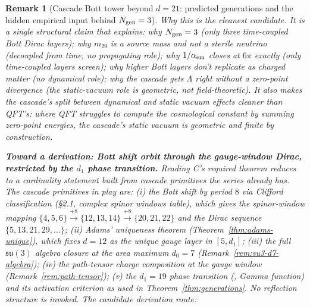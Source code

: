 \documentclass[12pt,a4paper]{article}
\newtheorem{remark}[theorem]{Remark}
\begin{document}
\begin{remark}[Cascade Bott tower beyond $d=21$: predicted generations and the hidden empirical input behind $N_{\rm gen}=3$]
\medskip\noindent\emph{Why this is the cleanest candidate.} It is a \emph{single} structural claim that explains: why $N_{\rm gen}=3$ (only three time-coupled Bott Dirac layers); why $m_{29}$ is a source mass and not a sterile neutrino (decoupled from time, no propagating role); why $1/\alpha_{\rm em}$ closes at $6\pi$ exactly (only time-coupled layers screen); why higher Bott layers don't replicate as charged matter (no dynamical role); why the cascade gets $\Lambda$ right without a zero-point divergence (the static-vacuum role is geometric, not field-theoretic). It also makes the cascade's split between dynamical and static vacuum effects \emph{cleaner than QFT's}: where QFT struggles to compute the cosmological constant by summing zero-point energies, the cascade's static vacuum is geometric and finite by construction.

\medskip\noindent\textbf{Toward a derivation: Bott shift orbit through the gauge-window Dirac, restricted by the $d_1$ phase transition.}
Reading C's required theorem reduces to a cardinality statement built from cascade primitives the series already has. The cascade primitives in play are: (i) the Bott shift by period $8$ via Clifford classification (\S2.1, complex spinor windows table), which gives the spinor-window mapping $\{4,5,6\} \xrightarrow{+8} \{12,13,14\} \xrightarrow{+8} \{20,21,22\}$ and the Dirac sequence $\{5,13,21,29,\ldots\}$; (ii) Adams' uniqueness theorem (Theorem~\ref{thm:adams-unique}), which fixes $d=12$ as the unique gauge layer in $[5,d_1]$; (iii) the full $\mathfrak{su}(3)$ algebra closure at the area maximum $d_0=7$ (Remark~\ref{rem:su3-d7-algebra}); (iv) the path-tensor charge composition at the gauge window (Remark~\ref{rem:path-tensor}); (v) the $d_1=19$ phase transition (\cite{part0}, Gamma function) and its activation criterion as used in Theorem~\ref{thm:generations}. \emph{No reflection structure is invoked.} The candidate derivation route:


\end{remark}
\end{document}
